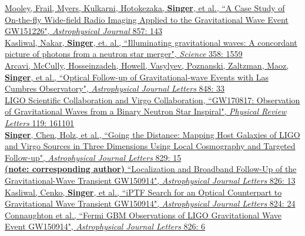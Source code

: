 \documentclass[10pt, letterpaper]{article} %
\newcommand{\years}[1]{\marginnote{\scriptsize #1}} %
\begin{document}
%
\years{2018}\href{https://doi.org/10.3847/1538-4357/aab7f3}{Mooley, Frail, Myers, Kulkarni, Hotokezaka, \textbf{Singer}, et al., “A Case Study of On-the-fly Wide-field Radio Imaging Applied to the Gravitational Wave Event GW151226", \emph{Astrophysical Journal} 857: 143}\\[0.125cm]
%
\years{2017}\href{https://doi.org/10.1126/science.aap9455}{Kasliwal, Nakar, \textbf{Singer}, et. al., “Illuminating gravitational waves: A concordant picture of photons from a neutron star merger", \emph{Science} 358: 1559}\\[0.125cm]
%
\years{2017}\href{https://doi.org/10.3847/2041-8213/aa910f}{Arcavi, McCully, Hosseinzadeh, Howell, Vasylyev, Poznanski, Zaltzman, Maoz, \textbf{Singer}, et al., “Optical Follow-up of Gravitational-wave Events with Las Cumbres Observatory", \emph{Astrophysical Journal Letters} 848: 33}\\[0.125cm]
%
\years{2017}\href{https://doi.org/10.1103/PhysRevLett.119.161101}{LIGO Scientific Collaboration and Virgo Collaboration, “GW170817: Observation of Gravitational Waves from a Binary Neutron Star Inspiral", \emph{Physical Review Letters} 119: 161101}\\[0.125cm]
%
\years{2016}\href{https://dx.doi.org/10.3847/2041-8205/829/1/L15}{\textbf{Singer}, Chen, Holz, et al., “Going the Distance: Mapping Host Galaxies of LIGO and Virgo Sources in Three Dimensions Using Local Cosmography and Targeted Follow-up", \emph{Astrophysical Journal Letters} 829: 15}\\[0.125cm]
%
\years{2016}\href{https://dx.doi.org/10.3847/2041-8205/826/1/L13}{\textbf{(note: corresponding author)} “Localization and Broadband Follow-Up of the Gravitational-Wave Transient GW150914", \emph{Astrophysical Journal Letters} 826: 13}\\[0.125cm]
%
\years{2016}\href{https://dx.doi.org/10.3847/2041-8205/824/2/L24}{Kasliwal, Cenko, \textbf{Singer}, et al., “iPTF Search for an Optical Counterpart to Gravitational Wave Transient GW150914", \emph{Astrophysical Journal Letters} 824: 24}\\[0.125cm]
%
\years{2016}\href{https://dx.doi.org/10.3847/2041-8205/826/1/L6}{Connaughton et al., “Fermi GBM Observations of LIGO Gravitational Wave Event GW150914", \emph{Astrophysical Journal Letters} 826: 6}\\[0.125cm]
%
\end{document}
